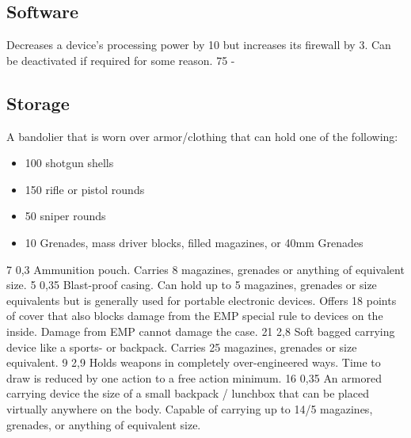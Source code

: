 \subsection{Software}
\vspace{10mm}
\begin{multicols}{2}
    {Decreases a device's processing power by 10 but increases its firewall by 3.
        Can be deactivated if required for some reason.}
    {75}
    {-}
\end{multicols}

\subsection{Storage}
\vspace{10mm}
\begin{multicols}{2}
    {A bandolier that is worn over armor/clothing that can hold one of the following:
        \begin{itemize}
        \item 100 shotgun shells
		\item 150 rifle or pistol rounds
        \item 50 sniper rounds
        \item 10 Grenades, mass driver blocks, filled magazines, or 40mm Grenades
    	\end{itemize}
	}
    {7}
    {0,3}
    {Ammunition pouch.
        Carries 8 magazines, grenades or anything of equivalent size.}
    {5}
    {0,35}
    {Blast-proof casing.
        Can hold up to 5 magazines, grenades or size equivalents
        but is generally used for portable electronic devices.
        Offers 18 points of cover that also blocks damage from the EMP special rule to devices on the inside.
        Damage from EMP cannot damage the case.}
    {21}
    {2,8}
    {Soft bagged carrying device like a sports- or backpack.
        Carries 25 magazines, grenades or size equivalent.}
    {9}
    {2,9}
    {Holds weapons in completely over-engineered ways.
        Time to draw is reduced by one action to a free action minimum.}
    {16}
    {0,35}
    {An armored carrying device the size of
        a small backpack / lunchbox that can be placed virtually anywhere on the body.
        Capable of carrying up to 14/5 magazines, grenades, or anything of equivalent size.\\
}
\end{multicols}
